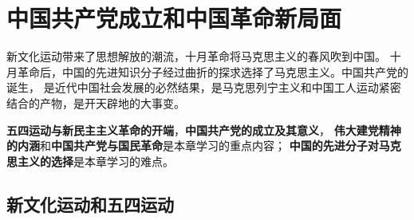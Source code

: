 \documentclass[10pt, UTF8]{ctexbook} %
\begin{document}





\newpage
\thispagestyle{empty}

\chapter{中国共产党成立和中国革命新局面}
\thispagestyle{empty}

\quad\quad 新文化运动带来了思想解放的潮流，十月革命将马克思主义的春风吹到中国。
十月革命后，中国的先进知识分子经过曲折的探求选择了马克思主义。中国共产党的诞生，
是近代中国社会发展的必然结果，是马克思列宁主义和中国工人运动紧密结合的产物，是开天辟地的大事变。

\textbf{五四运动与新民主主义革命的开端}，\textbf{中国共产党的成立及其意义}，
\textbf{伟大建党精神的内涵}和\textbf{中国共产党与国民革命}是本章学习的重点内容；
\textbf{中国的先进分子对马克思主义的选择}是本章学习的难点。


\section{新文化运动和五四运动}
\end{document}
